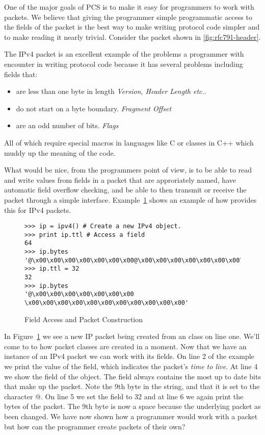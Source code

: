 \documentclass[11pt]{article}
\begin{document}
One of the major goals of PCS is to make it easy for programmers to
work with packets.  We believe that giving the programmer simple
programmatic access to the fields of the packet is the best way to
make writing protocol code simpler and to make reading it nearly
trivial. Consider the  packet shown in
\ref{fig:rfc791-header}.  

The IPv4 packet is an excellent example of the problems a programmer
with encounter in writing protocol code because it has several
problems including fields that:

\begin{itemize}
\item are less than one byte in length \emph{Version, Header Length etc.}.
\item do not start on a byte boundary. \emph{Fragment Offset}
\item are an odd number of bits. \emph{Flags}
\end{itemize}


All of which require special macros in languages like C or classes in
C++ which muddy up the meaning of the code.

What would be nice, from the programmers point of view, is to be able
to read and write values from fields in a packet that are approriately
named, have automatic field overflow checking, and be able to then
transmit or receive the packet through a simple interface.
Example~\ref{fig:field-access-and-packet-construction} shows an
example of how  provides this for IPv4 packets.

\begin{figure}
  \centering
\begin{verbatim}
>>> ip = ipv4() # Create a new IPv4 object.
>>> print ip.ttl # Access a field
64
>>> ip.bytes
'@\x00\x00\x00\x00\x00\x00\x00@\x00\x00\x00\x00\x00\x00\x00\x00\x00\x00\x00'
>>> ip.ttl = 32
32
>>> ip.bytes
'@\x00\x00\x00\x00\x00\x00\x00 \x00\x00\x00\x00\x00\x00\x00\x00\x00\x00\x00'
\end{verbatim}
  \caption{Field Access and Packet Construction}
  \label{fig:field-access-and-packet-construction}
\end{figure}

In Figure~\ref{fig:field-access-and-packet-construction} we see a new
IP packet being created from an  class on line one.  We'll
come to to how packet classes are created in a moment.  Now that we
have an instance of an IPv4 packet we can work with its fields.  On
line 2 of the example we print the value of the  field,
which indicates the packet's \emph{time to live}.  At line 4 we show
the  field of the  object.  The 
field always contains the most up to date bits that make up the
packet.  Note the 9th byte in the string, and that it is set to the
character @.  On line 5 we set the  field to 32 and at line
6 we again print the bytes of the packet.  The 9th byte is now a space
because the underlying packet as been changed.  We have now shown how
a programmer would work with a packet but how can the programmer
create packets of their own?
\end{document}
